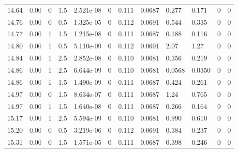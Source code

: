 \documentclass[preview]{standalone}
\begin{document}
{{{{{{{{\begin{tabular}{L{1.2cm}C{1.2cm} C{0.3cm}C{0.5cm} C{1.4cm}C{1.4cm} C{1.4cm}C{1.4cm} C{1.6cm}C{1.6cm} C{1.6cm}C{1.6cm}}
  14.64  &  0.00  & 0     & 1.5 &  2.521e-08  & 0  &  0.111&   0.0687& 0.277 & 0.171   &  0 & 0  \\ 
  14.76  &  0.00  & 0     & 0.5 &  1.325e-05  & 0  &  0.112&   0.0691& 0.544 & 0.335   &  0 & 0  \\ 
  14.77  &  0.00  & 1     & 1.5 &  1.215e-08  & 0  &  0.111&   0.0687& 0.188 & 0.116   &  0 & 0  \\ 
  14.80  &  0.00  & 1     & 0.5 &  5.110e-09  & 0  &  0.112&   0.0691& 2.07 & 1.27   &  0 & 0  \\ 
  14.84  &  0.00  & 1     & 2.5 &  2.852e-08  & 0  &  0.110&   0.0681& 0.356 & 0.219   &  0 & 0  \\ 
  14.86  &  0.00  & 1     & 2.5 &  6.644e-09  & 0  &  0.110&   0.0681& 0.0568 & 0.0350   &  0 & 0  \\ 
  14.86  &  0.00  & 1     & 1.5 &  1.490e-09  & 0  &  0.111&   0.0687& 0.424 & 0.261   &  0 & 0  \\ 
  14.97  &  0.00  & 0     & 1.5 &  8.634e-07  & 0  &  0.111&   0.0687& 1.24 & 0.765   &  0 & 0  \\ 
  14.97  &  0.00  & 1     & 1.5 &  1.640e-08  & 0  &  0.111&   0.0687& 0.266 & 0.164   &  0 & 0  \\ 
  15.17  &  0.00  & 1     & 2.5 &  5.594e-09  & 0  &  0.110&   0.0681& 0.990 & 0.610   &  0 & 0  \\ 
  15.20  &  0.00  & 0     & 0.5 &  3.219e-06  & 0  &  0.112&   0.0691& 0.384 & 0.237   &  0 & 0  \\ 
  15.31  &  0.00  & 0     & 1.5 &  1.571e-05  & 0  &  0.111&   0.0687& 0.398 & 0.246   &  0 & 0  \\ 
\hline 
\end{tabular} 

}}}}}}}}
\end{document}
